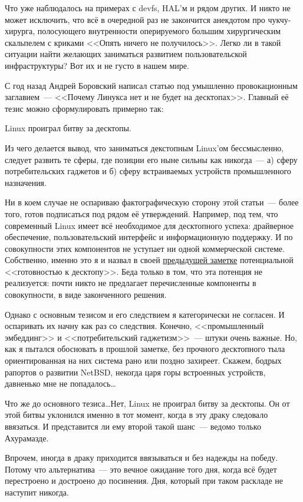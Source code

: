 Что уже наблюдалось на примерах с devfs, HAL'м и рядом других. И никто не может исключить, что всё в очередной раз не закончится анекдотом про чукчу-хирурга, полосующего внутренности оперируемого большим хирургическим скальпелем с криками <<Опять ничего не получилось>>. Легко ли в такой ситуации найти желающих заниматься развитием пользовательской инфраструктуры? Вот их и не густо в нашем мире.

С год назад Андрей Боровский написал статью под умышленно провокационным заглавием~--- <<Почему Линукса нет и не будет на десктопах>>. Главный её тезис можно сформулировать примерно так:

\begin{shadequote}{}
Linux проиграл битву за десктопы.
\end{shadequote}
Из чего делается вывод, что заниматься декстопным Linux'ом бессмысленно, следует развить те сферы, где позиции его ныне сильны как никогда~--- а) сферу потребительских гаджетов и б) сферу встраиваемых устройств промышленного назначения.

Ни в коем случае не оспариваю фактографическую сторону этой статьи~--- более того, готов подписаться под рядом её утверждений. Например, под тем, что современный Linux имеет всё необходимое для десктопного успеха: драйверное обеспечение, пользовательский интерфейс и информационную поддержку. И по совокупности этих компонентов не уступает ни одной коммерческой системе. Собственно, именно это я и назвал в своей \href{http://alv.me/?p=1532}{предыдущей заметке} потенциальной <<готовностью к десктопу>>. Беда только в том, что эта потенция не реализуется: почти никто не предлагает перечисленные компоненты в совокупности, в виде законченного решения.

Однако с основным тезисом и его следствием я категорически не согласен. И оспаривать их начну как раз со следствия. Конечно, <<промышленный эмбеддинг>> и <<потребительский гаджетизм>>~--- штуки очень важные. Но, как я пытался обосновать в прошлой заметке, без прочного десктопного тыла ориентированная на них система рано или поздно захиреет. Скажем, бодрых рапортов о развитии NetBSD, некогда царя горы встроенных устройств, давненько мне не попадалось\dots

Что же до основного тезиса\dots Нет, Linux не проиграл битву за десктопы. Он от этой битвы уклонился именно в тот момент, когда в эту драку следовало ввязаться. И представится ли ему второй такой шанс~--- ведомо только Ахурамазде.

Впрочем, иногда в драку приходится ввязываться и без надежды на победу. Потому что альтернатива~--- это вечное ожидание того дня, когда всё будет перестроено и достроено до посинения. Дня, который при таком раскладе не наступит никогда.

